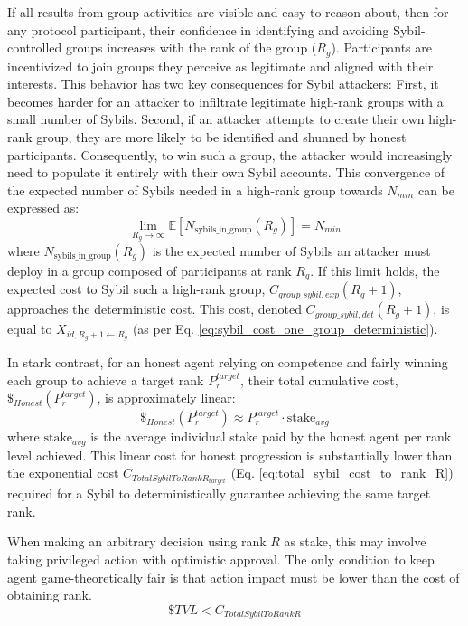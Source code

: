 \documentclass{article}
\begin{document}
\begin{CJK}{UTF8}{gbsn}
        {{If all results from group activities are visible and easy to reason about, then for any protocol participant, their confidence in identifying and avoiding Sybil-controlled groups increases with the rank of the group ($R_g$). Participants are incentivized to join groups they perceive as legitimate and aligned with their interests. This behavior has two key consequences for Sybil attackers:}}
        First, it becomes harder for an attacker to infiltrate legitimate high-rank groups with a small number of Sybils. Second, if an attacker attempts to create their own high-rank group, they are more likely to be identified and shunned by honest participants. Consequently, to win such a group, the attacker would increasingly need to populate it entirely with their own Sybil accounts. This convergence of the expected number of Sybils needed in a high-rank group towards $N_{min}$ can be expressed as:
        \begin{equation}
            \label{eq:limit-nmin-refined}
            \lim_{R_g \to \infty} \mathbb{E}[N_{\text{sybils\_in\_group}}(R_g)] = N_{min}
        \end{equation}
        where $N_{\text{sybils\_in\_group}}(R_g)$ is the expected number of Sybils an attacker must deploy in a group composed of participants at rank $R_g$. If this limit holds, the expected cost to Sybil such a high-rank group, $C_{group\_sybil,exp}(R_g+1)$, approaches the deterministic cost. This cost, denoted $C_{group\_sybil,det}(R_g+1)$, is equal to $X_{id,R_g+1 \leftarrow R_g}$ (as per Eq. \ref{eq:sybil_cost_one_group_deterministic}).

        In stark contrast, for an honest agent relying on competence and fairly winning each group to achieve a target rank $P_r^{target}$, their total cumulative cost, $\$_{Honest}(P_r^{target})$, is approximately linear:
        \begin{equation}
            \label{eq:cost_honest_agent}
            \$_{Honest}(P_r^{target}) \approx P_r^{target} \cdot \text{stake}_{avg}
        \end{equation}
        where $\text{stake}_{avg}$ is the average individual stake paid by the honest agent per rank level achieved. This linear cost for honest progression is substantially lower than the exponential cost $C_{TotalSybilToRankR_{target}}$ (Eq. \ref{eq:total_sybil_cost_to_rank_R}) required for a Sybil to deterministically guarantee achieving the same target rank.

        When making an arbitrary decision using rank $R$ as stake, this may involve taking privileged action with optimistic approval. The only condition to keep agent game-theoretically fair is that action impact must be lower than the cost of obtaining rank.
        \begin{equation}
            \label{eq:tvl_sybil_relation}
            \$TVL < C_{TotalSybilToRankR}
        \end{equation}



\end{CJK}
\end{document}
